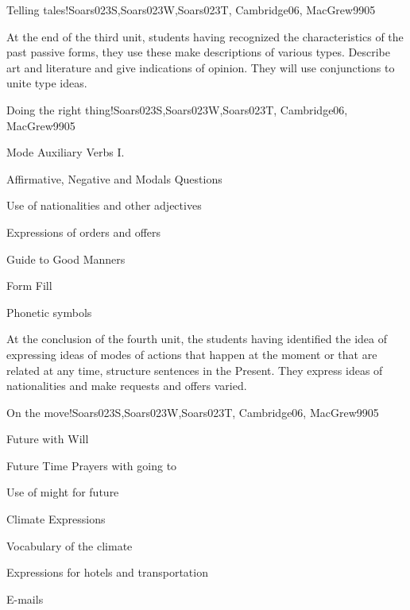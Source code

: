 \begin{syllabus}
\begin{unit}{Telling tales!}{Soars023S,Soars023W,Soars023T, Cambridge06, MacGrew99}{0}{5}
   \begin{learningoutcomes}
      \item At the end of the third unit, students having recognized the characteristics of the past passive forms, they use these make descriptions of various types. Describe art and literature and give indications of opinion. They will use conjunctions to unite type ideas.
   \end{learningoutcomes}
\end{unit}

\begin{unit}{Doing the right thing!}{Soars023S,Soars023W,Soars023T, Cambridge06, MacGrew99}{0}{5}
   \begin{topics}
      \item Mode Auxiliary Verbs I.
      \item Affirmative, Negative and Modals Questions
      \item Use of nationalities and other adjectives
      \item Expressions of orders and offers
      \item Guide to Good Manners
      \item Form Fill
      \item Phonetic symbols
   \end{topics}

   \begin{learningoutcomes}
      \item At the conclusion of the fourth unit, the students having identified the idea of expressing ideas of modes of actions that happen at the moment or that are related at any time, structure sentences in the Present. They express ideas of nationalities and make requests and offers varied.
   \end{learningoutcomes}

\end{unit}

\begin{unit}{On the move!}{Soars023S,Soars023W,Soars023T, Cambridge06, MacGrew99}{0}{5}
   \begin{topics}
      \item Future with Will
      \item Future Time Prayers with going to
      \item Use of might for future
      \item Climate Expressions
      \item Vocabulary of the climate
      \item Expressions for hotels and transportation
      \item E-mails
   \end{topics}


\end{unit}
\end{syllabus}
